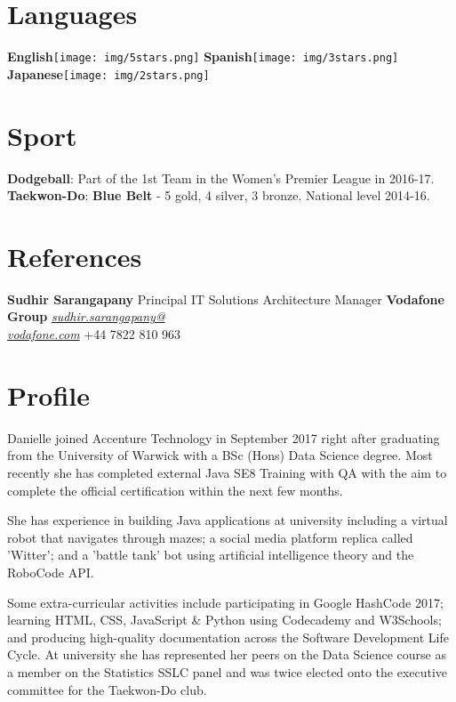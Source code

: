 \documentclass[]{friggeri-cv}
\begin{document}
\begin{aside}
    \section{Languages}
        \textbf{English}\texttt{[image: img/5stars.png]}
        \textbf{Spanish}\texttt{[image: img/3stars.png]}
        \textbf{Japanese}\texttt{[image: img/2stars.png]}
    ~
    \section{Sport}
        \textbf{Dodgeball}:
        Part of the 1st Team in the Women's Premier League in 2016-17.
        \textbf{Taekwon-Do}:
        \textbf{Blue Belt} - 5 gold, 4 silver, 3 bronze.
        National level 2014-16.
    ~
    \section{References}
        \textbf{Sudhir Sarangapany}
        Principal IT Solutions Architecture Manager
        \textbf{Vodafone Group}
        \href{mailto:sudhir.sarangapany@vodafone.com}{\emph{sudhir.sarangapany@\\vodafone.com}}
        +44 7822 810 963
    ~
\end{aside}

\section{Profile}
      Danielle joined Accenture Technology in September 2017 right after graduating from the University of Warwick with a BSc (Hons) Data Science degree. Most recently she has completed external Java SE8 Training with QA with the aim to complete the official certification within the next few months.
      
      She has experience in building Java applications at university including a virtual robot that navigates through mazes; a social media platform replica called 'Witter'; and a 'battle tank' bot using artificial intelligence theory and the RoboCode API.
      
      Some extra-curricular activities include participating in Google HashCode 2017; learning HTML, CSS, JavaScript \& Python using Codecademy and W3Schools; and producing high-quality documentation across the Software Development Life Cycle. At university she has represented her peers on the Data Science course as a member on the Statistics SSLC panel and was twice elected onto the executive committee for the Taekwon-Do club.
\end{document}
